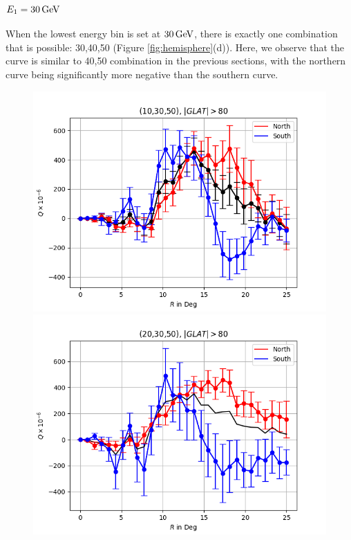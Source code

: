 \documentclass[english]{article}
\newcommand{\GeV}{\,{\rm GeV}}
\begin{document}
\subsubsection{$E_1 = 30 \GeV$}
When the lowest energy bin is set at $30 \GeV$, there is exactly one combination
that is possible: 30,40,50 (Figure \ref{fig:hemisphere}(d)).
Here, we observe that the curve is similar to 40,50 combination in the previous 
sections, with the northern curve being significantly more negative than the
southern curve.


\begin{figure}
	\centering
	\includegraphics[scale=0.5]{10_30_50_full.png}\includegraphics[scale=0.5]{20_30_50_full.png}

\end{figure}
\end{document}
